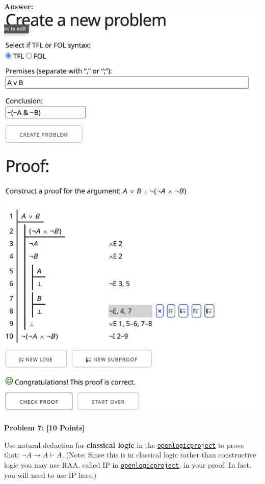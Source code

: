 \documentclass[12pt]{article}
\newcommand{\TURN}{\vdash}
\newcommand{\IMPLIES}{\rightarrow}
\newcommand{\Problem}[3]{\mbox{} \newline \noindent \textbf{\textbf{Problem #1: #2 [#3 Points] \\ }}}
\begin{document}
\bf{Answer:}
\includegraphics[scale = 0.4]{hw2pr6.png}

\Problem{7}{}{10}

Use natural deduction for \textbf{classical logic} in the \href{http://proofs.openlogicproject.org}{\texttt{openlogicproject}} to prove  that:  $\neg A \IMPLIES A \TURN A$.  (Note:  Since this is in classical logic rather than constructive logic you may use RAA, called IP in \href{http://proofs.openlogicproject.org}{\texttt{openlogicproject}},  in your proof.  In fact, you will need to use IP here.)
\end{document}
